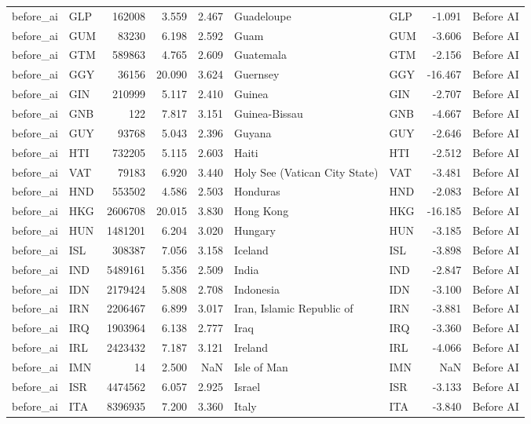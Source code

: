 \begin{tabular}{llrrrllrl}
before\_ai & GLP & 162008 & 3.559 & 2.467 & Guadeloupe & GLP & -1.091 & Before AI \\
before\_ai & GUM & 83230 & 6.198 & 2.592 & Guam & GUM & -3.606 & Before AI \\
before\_ai & GTM & 589863 & 4.765 & 2.609 & Guatemala & GTM & -2.156 & Before AI \\
before\_ai & GGY & 36156 & 20.090 & 3.624 & Guernsey & GGY & -16.467 & Before AI \\
before\_ai & GIN & 210999 & 5.117 & 2.410 & Guinea & GIN & -2.707 & Before AI \\
before\_ai & GNB & 122 & 7.817 & 3.151 & Guinea-Bissau & GNB & -4.667 & Before AI \\
before\_ai & GUY & 93768 & 5.043 & 2.396 & Guyana & GUY & -2.646 & Before AI \\
before\_ai & HTI & 732205 & 5.115 & 2.603 & Haiti & HTI & -2.512 & Before AI \\
before\_ai & VAT & 79183 & 6.920 & 3.440 & Holy See (Vatican City State) & VAT & -3.481 & Before AI \\
before\_ai & HND & 553502 & 4.586 & 2.503 & Honduras & HND & -2.083 & Before AI \\
before\_ai & HKG & 2606708 & 20.015 & 3.830 & Hong Kong & HKG & -16.185 & Before AI \\
before\_ai & HUN & 1481201 & 6.204 & 3.020 & Hungary & HUN & -3.185 & Before AI \\
before\_ai & ISL & 308387 & 7.056 & 3.158 & Iceland & ISL & -3.898 & Before AI \\
before\_ai & IND & 5489161 & 5.356 & 2.509 & India & IND & -2.847 & Before AI \\
before\_ai & IDN & 2179424 & 5.808 & 2.708 & Indonesia & IDN & -3.100 & Before AI \\
before\_ai & IRN & 2206467 & 6.899 & 3.017 & Iran, Islamic Republic of & IRN & -3.881 & Before AI \\
before\_ai & IRQ & 1903964 & 6.138 & 2.777 & Iraq & IRQ & -3.360 & Before AI \\
before\_ai & IRL & 2423432 & 7.187 & 3.121 & Ireland & IRL & -4.066 & Before AI \\
before\_ai & IMN & 14 & 2.500 & NaN & Isle of Man & IMN & NaN & Before AI \\
before\_ai & ISR & 4474562 & 6.057 & 2.925 & Israel & ISR & -3.133 & Before AI \\
before\_ai & ITA & 8396935 & 7.200 & 3.360 & Italy & ITA & -3.840 & Before AI \\

\end{tabular}
